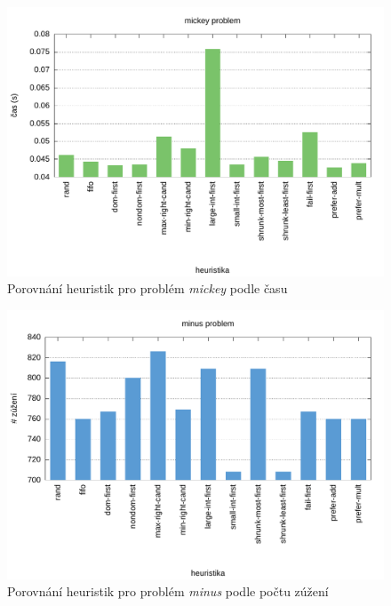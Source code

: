 {\begin{figure}[H]
\centering
\includegraphics[scale=0.68]{chart/mickey_time.pdf}
\caption{Porovnání heuristik pro problém \emph{mickey} podle času}
\end{figure}



\begin{figure}[H]
\centering
\includegraphics[scale=0.68]{chart/minus_nar.pdf}
\caption{Porovnání heuristik pro problém \emph{minus} podle počtu zúžení}
\end{figure}


}
